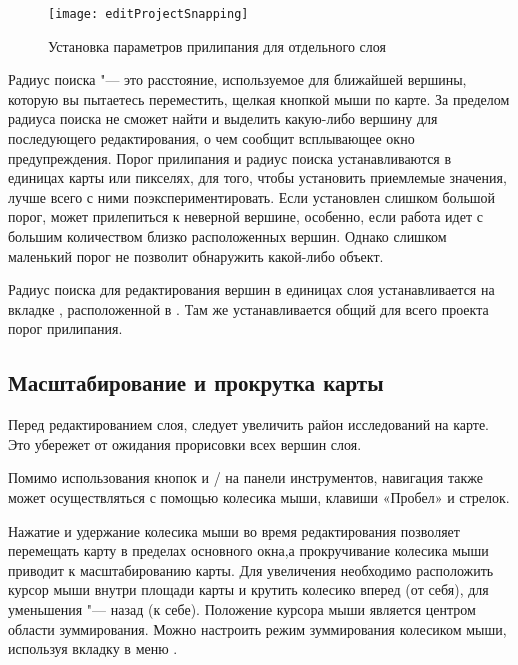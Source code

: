 \begin{figure}[ht]
   \centering
   \texttt{[image: editProjectSnapping]}
   \caption{Установка параметров прилипания для отдельного слоя \nixcaption}\label{fig:snappingoptions}
\end{figure}


Радиус поиска "--- это расстояние, используемое \qg для 
ближайшей вершины, которую вы пытаетесь переместить, щелкая кнопкой мыши
по карте. За пределом радиуса поиска \qg не сможет найти и выделить
какую-либо вершину для последующего редактирования, о чем сообщит
всплывающее окно предупреждения. Порог прилипания и радиус поиска
устанавливаются в единицах карты или пикселях, для того, чтобы установить
приемлемые значения, лучше всего с ними поэкспериментировать. Если установлен
слишком большой порог, \qg может прилепиться к неверной вершине, особенно,
если работа идет с большим количеством близко расположенных вершин. Однако
слишком маленький порог не позволит обнаружить какой-либо объект.

Радиус поиска для редактирования вершин в единицах слоя устанавливается
на вкладке , расположенной в  \arrow
{}. Там же устанавливается общий
для всего проекта порог прилипания.

\subsection{Масштабирование и прокрутка карты}

Перед редактированием слоя, следует увеличить район исследований на карте.
Это убережет от ожидания прорисовки всех вершин слоя.

Помимо использования кнопок  и
/
на панели инструментов, навигация также может осуществляться с
помощью колесика мыши, клавиши «Пробел» и стрелок.


Нажатие и удержание колесика мыши во время редактирования позволяет перемещать
карту в пределах основного окна,а прокручивание колесика мыши приводит к
масштабированию карты. Для увеличения необходимо расположить курсор мыши внутри
площади карты и крутить колесико вперед (от себя), для уменьшения "--- назад
(к себе). Положение курсора мыши является центром области зуммирования. Можно
настроить режим зуммирования колесиком мыши, используя вкладку
 в меню  \arrow {}.

